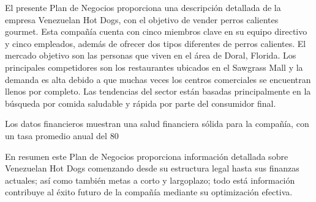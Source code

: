 

El presente Plan de Negocios proporciona una descripción detallada de la empresa Venezuelan Hot Dogs, con el objetivo de vender perros calientes gourmet. Esta compañía cuenta con cinco miembros clave en su equipo directivo y cinco empleados, además de ofrecer dos tipos diferentes de perros calientes. El mercado objetivo son las personas que viven en el área de Doral, Florida. Los principales competidores son los restaurantes ubicados en el Sawgrass Mall y la demanda es alta debido a que muchas veces los centros comerciales se encuentran llenos por completo. Las tendencias del sector están basadas principalmente en la búsqueda por comida saludable y rápida por parte del consumidor final. 

Los datos financieros muestran una salud financiera sólida para la compañía, con un tasa promedio anual del 80%

En resumen este Plan de Negocios proporciona información detallada sobre Venezuelan Hot Dogs comenzando desde su estructura legal hasta sus finanzas actuales; así como también metas a corto y largoplazo; todo está información contribuye al éxito futuro de la compañía mediante su optimización efectiva.